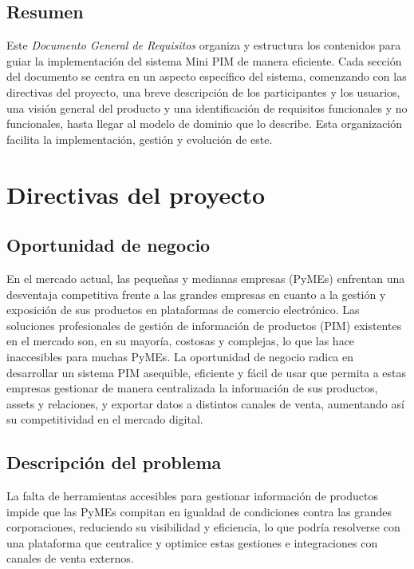 \documentclass[12pt.a4paper]{article}
\begin{document}
\subsection{Resumen}

Este \textit{Documento General de Requisitos} organiza y estructura los contenidos para guiar la implementación del sistema Mini PIM de manera eficiente. Cada sección del documento se centra en un aspecto específico del sistema, comenzando con las directivas del proyecto, una breve descripción de los participantes y los usuarios, una visión general del producto y una identificación de requisitos funcionales y no funcionales, hasta llegar al modelo de dominio que lo describe. Esta organización facilita la implementación, gestión y evolución de este.

\section{Directivas del proyecto}

\subsection{Oportunidad de negocio}

En el mercado actual, las pequeñas y medianas empresas (PyMEs) enfrentan una desventaja competitiva frente a las grandes empresas en cuanto a la gestión y exposición de sus productos en plataformas de comercio electrónico. Las soluciones profesionales de gestión de información de productos (PIM) existentes en el mercado son, en su mayoría, costosas y complejas, lo que las hace inaccesibles para muchas PyMEs. La oportunidad de negocio radica en desarrollar un sistema PIM asequible, eficiente y fácil de usar que permita a estas empresas gestionar de manera centralizada la información de sus productos, assets y relaciones, y exportar datos a distintos canales de venta, aumentando así su competitividad en el mercado digital.

\subsection{Descripción del problema}

La falta de herramientas accesibles para gestionar información de productos impide que las PyMEs compitan en igualdad de condiciones contra las grandes corporaciones, reduciendo su visibilidad y eficiencia, lo que podría resolverse con una plataforma que centralice y optimice estas gestiones e integraciones con canales de venta externos.
\end{document}
